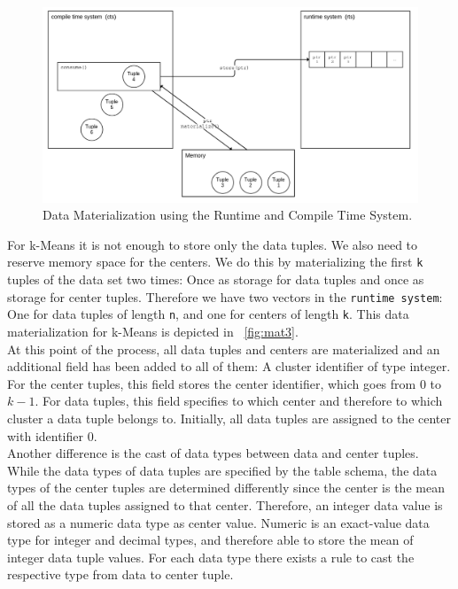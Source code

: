 \begin{figure}[htsb]
  \centerline{
  \includegraphics[scale=0.37]{figures/mat2_font4}
  }
  \caption[Data Materialization using the Runtime and Compile Time System]{Data Materialization using the Runtime and Compile Time System.}
  \label{fig:mat2}
\end{figure}

For k-Means it is not enough to store only the data tuples. We also need to reserve memory space for the centers. We do this by materializing the first \texttt{k} tuples of the data set two times: Once as storage for data tuples and once as storage for center tuples. Therefore we have two vectors in the \texttt{runtime system}: One for data tuples of length \texttt{n}, and one for centers of length \texttt{k}. This data materialization for k-Means is depicted in ~\autoref{fig:mat3}.
\\ 
At this point of the process, all data tuples and centers are materialized and an additional field has been added to all of them: A cluster identifier of type integer. For the center tuples, this field stores the center identifier, which goes from 0 to $k - 1$. For data tuples, this field specifies to which center and therefore to which cluster a data tuple belongs to. Initially, all data tuples are assigned to the center with identifier 0. 
\\
Another difference is the cast of data types between data and center tuples. While the data types of data tuples are specified by the table schema, the data types of the center tuples are determined differently since the center is the mean of all the data tuples assigned to that center. Therefore, an integer data value is stored as a numeric data type as center value. Numeric is an exact-value data type for integer and decimal types, and therefore able to store the mean of integer data tuple values. For each data type there exists a rule to cast the respective type from data to center tuple.



